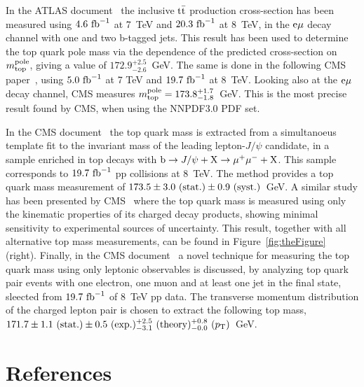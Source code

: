 \documentclass{blois}
\begin{document}
In the ATLAS document~\cite{bib:ATLAS-topCrossSection} the inclusive ${\rm t{\bar t}}$
production cross-section has been measured using $4.6~{\rm fb}^{-1}$ at 7~TeV and
$20.3~{\rm fb}^{-1}$ at 8~TeV, in the ${\rm e}\mu$ decay channel with one and two
b-tagged jets.
This result has been used to determine the top quark pole mass via the dependence
of the predicted cross-section on $m_{\rm top}^{\rm pole}$, giving a value of
$172.9^{+2.5}_{-2.6}$~GeV. The same is done in the following CMS
paper~\cite{bib:CMS-topCrossSection}, using $5.0~{\rm fb}^{-1}$ at 7 TeV and
$19.7~{\rm fb}^{-1}$ at 8~TeV. Looking also at the ${\rm e}\mu$ decay channel,
CMS measures $m_{\rm top}^{\rm pole} = 173.8^{+1.7}_{-1.8}$~GeV. This is the
most precise result found by CMS, when using the NNPDF3.0 PDF set.

In the CMS document~\cite{bib:CMS-topMassFromJpsi} the top quark mass is extracted
from a simultanoeus template fit to the invariant mass of the leading
lepton-$J/\psi$ candidate, in a sample enriched in top decays with
${\rm b}\to J/\psi + {\rm X}\to \mu^+\mu^- + {\rm X}$. This sample corresponds
to $19.7~{\rm fb}^{-1}$ pp collisions at 8~TeV. The method provides a top quark
mass measurement of $173.5 \pm 3.0~({\rm stat.}) \pm 0.9~({\rm syst.})$~GeV.
A similar study has been presented by CMS~\cite{bib:CMS-topMassFromCharged} where
the top quark mass is measured using only the kinematic properties of its charged
decay products, showing minimal sensitivity to experimental sources of uncertainty.
This result, together with all alternative top mass measurements, can be found in
Figure~\ref{fig:theFigure} (right). Finally, in the CMS
document~\cite{bib:CMS-topMassFromLeptons} a novel technique for measuring the
top quark mass using only leptonic observables is discussed, by analyzing top
quark pair events with one electron, one muon and at least one jet in the final
state, sleected from $19.7~{\rm fb}^{-1}$ of 8~TeV pp data. The transverse
momentum distribution of the charged lepton pair is chosen to extract the
following top mass,
$171.7 \pm 1.1~({\rm stat.}) \pm 0.5~({\rm exp.})^{+2.5}_{-3.1}~({\rm theory})^{+0.8}_{-0.0}~(p_{\rm T})$~GeV.


\section*{References}
\end{document}

